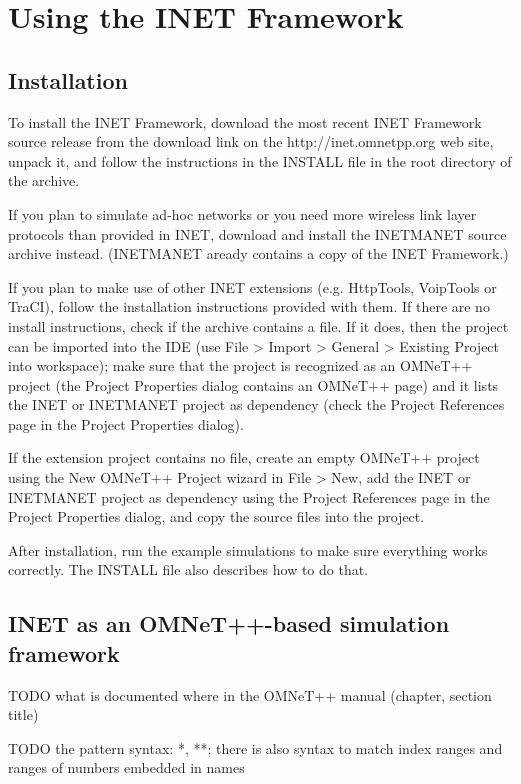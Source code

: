 \chapter{Using the INET Framework}
\label{cha:usage}

\section{Installation}

To install the INET Framework, download the most recent INET Framework source
release from the download link on the http://inet.omnetpp.org web site,
unpack it, and follow the instructions in the INSTALL file in the root
directory of the archive.

If you plan to simulate ad-hoc networks or you need more wireless link layer
protocols than provided in INET, download and install the INETMANET source
archive instead. (INETMANET aready contains a copy of the INET Framework.)

If you plan to make use of other INET extensions (e.g. HttpTools, VoipTools or TraCI),
follow the installation instructions provided with them. If there are no
install instructions, check if the archive contains a  file.
If it does, then the project can be imported into the IDE (use File > Import >
General > Existing Project into workspace); make sure that the project is recognized
as an OMNeT++ project (the Project Properties dialog contains an OMNeT++ page)
and it lists the INET or INETMANET project as dependency (check the Project References
page in the Project Properties dialog).

If the extension project contains no  file, create an empty OMNeT++
project using the New OMNeT++ Project wizard in File > New, add the INET or INETMANET
project as dependency using the Project References page in the Project Properties dialog,
and copy the source files into the project.

After installation, run the example simulations to make sure everything works
correctly. The INSTALL file also describes how to do that.


\section{INET as an OMNeT++-based simulation framework}

TODO what is documented where in the OMNeT++ manual (chapter, section title)

TODO the pattern syntax: *, **; there is also syntax to match index ranges and
ranges of numbers embedded in names


